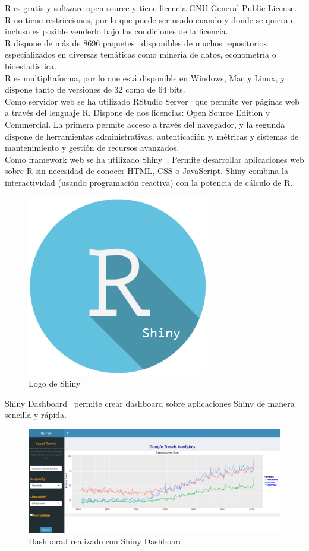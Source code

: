 R es gratis y software open-source y tiene licencia GNU General Public License. R no tiene restricciones, por lo que puede ser usado cuando y donde se quiera e incluso es posible venderlo bajo las condiciones de la licencia.\\

R dispone de más de 8696 paquetes~\cite{Rpaquetes} disponibles de muchos repositorios especializados en diversas temáticas como minería de datos, econometría o bioestadística.\\

R es multipltaforma, por lo que está disponible en Windows, Mac y Linux, y dispone tanto de versiones de 32 como de 64 bits.\\

Como servidor web se ha utilizado RStudio Server~\cite{RStudioServer} que permite ver páginas web a través del lenguaje R. Dispone de dos licencias: Open Source Edition y Commercial. La primera permite acceso a través del navegador, y la segunda dispone de herramientas administrativas, autenticación y, métricas y sistemas de mantenimiento y gestión de recursos avanzados.\\

Como framework web se ha utilizado Shiny~\cite{Shiny}. Permite desarrollar aplicaciones web sobre R sin necesidad de conocer HTML, CSS o JavaScript. Shiny combina la interactividad (usando programación reactiva) con la potencia de cálculo de R.\\

\begin{figure}[htbp!]
	\centering
	\includegraphics[width=0.3\linewidth]{imagenes/RShiny}
	\caption{Logo de Shiny}
	\label{fig:RShiny}
\end{figure}

Shiny Dashboard~\cite{ShinyDashboard} permite crear dashboard sobre aplicaciones Shiny de manera sencilla y rápida.\\

\begin{figure}
\centering
\includegraphics[width=0.7\linewidth]{imagenes/shinydashboard}
\caption{Dashborad realizado con Shiny Dashboard}
\label{fig:shinydashboard}
\end{figure}

